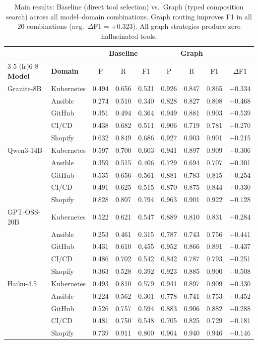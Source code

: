 \begin{table}[t]
\centering
\small
\begin{tabular}{ll ccc ccc c}
\toprule
& & \multicolumn{3}{c}{\textbf{Baseline}} & \multicolumn{3}{c}{\textbf{Graph}} & \\
\cmidrule(lr){3-5} \cmidrule(lr){6-8}
\textbf{Model} & \textbf{Domain} & P & R & F1 & P & R & F1 & $\Delta$F1 \\
\midrule
Granite-8B & Kubernetes & 0.494 & 0.656 & 0.531 & 0.926 & 0.847 & 0.865 & +0.334 \\
 & Ansible & 0.274 & 0.510 & 0.340 & 0.828 & 0.827 & 0.808 & +0.468 \\
 & GitHub & 0.351 & 0.494 & 0.364 & 0.949 & 0.881 & 0.903 & +0.539 \\
 & CI/CD & 0.438 & 0.682 & 0.511 & 0.906 & 0.719 & 0.781 & +0.270 \\
 & Shopify & 0.632 & 0.849 & 0.686 & 0.927 & 0.903 & 0.901 & +0.215 \\
\midrule
Qwen3-14B & Kubernetes & 0.597 & 0.700 & 0.603 & 0.941 & 0.897 & 0.909 & +0.306 \\
 & Ansible & 0.359 & 0.515 & 0.406 & 0.729 & 0.694 & 0.707 & +0.301 \\
 & GitHub & 0.535 & 0.656 & 0.561 & 0.881 & 0.783 & 0.815 & +0.254 \\
 & CI/CD & 0.491 & 0.625 & 0.515 & 0.870 & 0.875 & 0.844 & +0.330 \\
 & Shopify & 0.828 & 0.807 & 0.794 & 0.963 & 0.901 & 0.922 & +0.128 \\
\midrule
GPT-OSS-20B & Kubernetes & 0.522 & 0.621 & 0.547 & 0.889 & 0.810 & 0.831 & +0.284 \\
 & Ansible & 0.253 & 0.461 & 0.315 & 0.787 & 0.743 & 0.756 & +0.441 \\
 & GitHub & 0.431 & 0.610 & 0.455 & 0.952 & 0.866 & 0.891 & +0.437 \\
 & CI/CD & 0.486 & 0.702 & 0.542 & 0.842 & 0.787 & 0.793 & +0.251 \\
 & Shopify & 0.363 & 0.528 & 0.392 & 0.923 & 0.885 & 0.900 & +0.508 \\
\midrule
Haiku-4.5 & Kubernetes & 0.493 & 0.810 & 0.579 & 0.941 & 0.897 & 0.909 & +0.330 \\
 & Ansible & 0.224 & 0.562 & 0.301 & 0.778 & 0.741 & 0.753 & +0.452 \\
 & GitHub & 0.526 & 0.757 & 0.594 & 0.883 & 0.906 & 0.882 & +0.288 \\
 & CI/CD & 0.481 & 0.750 & 0.548 & 0.705 & 0.825 & 0.729 & +0.181 \\
 & Shopify & 0.739 & 0.911 & 0.800 & 0.964 & 0.940 & 0.946 & +0.146 \\
\bottomrule
\end{tabular}
\caption{Main results: Baseline (direct tool selection) vs.\ Graph (typed composition search) across all model--domain combinations. Graph routing improves F1 in all 20 combinations (avg.\ $\Delta$F1 = +0.323). All graph strategies produce zero hallucinated tools.}
\label{tab:main-results}
\end{table}